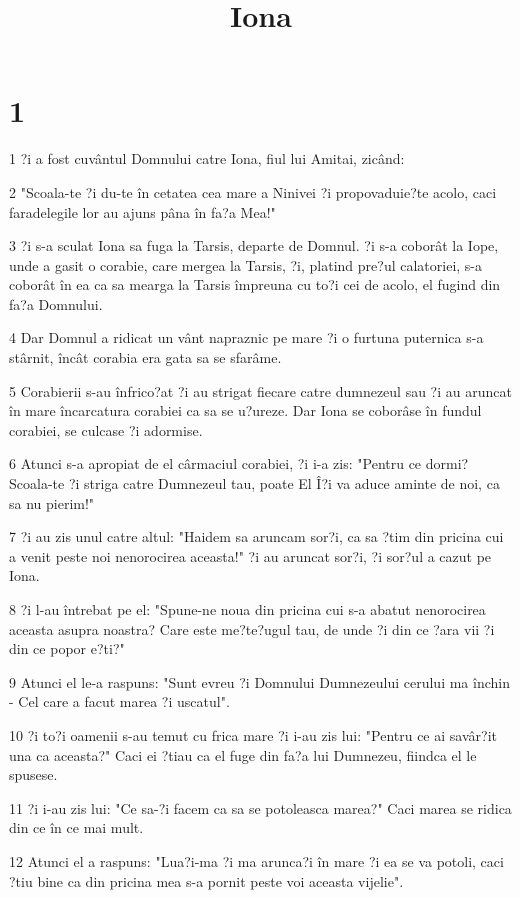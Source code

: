 

\title{Iona}


\chapter{1}

\par 1 ?i a fost cuvântul Domnului catre Iona, fiul lui Amitai, zicând:
\par 2 "Scoala-te ?i du-te în cetatea cea mare a Ninivei ?i propovaduie?te acolo, caci faradelegile lor au ajuns pâna în fa?a Mea!"
\par 3 ?i s-a sculat Iona sa fuga la Tarsis, departe de Domnul. ?i s-a coborât la Iope, unde a gasit o corabie, care mergea la Tarsis, ?i, platind pre?ul calatoriei, s-a coborât în ea ca sa mearga la Tarsis împreuna cu to?i cei de acolo, el fugind din fa?a Domnului.
\par 4 Dar Domnul a ridicat un vânt napraznic pe mare ?i o furtuna puternica s-a stârnit, încât corabia era gata sa se sfarâme.
\par 5 Corabierii s-au înfrico?at ?i au strigat fiecare catre dumnezeul sau ?i au aruncat în mare încarcatura corabiei ca sa se u?ureze. Dar Iona se coborâse în fundul corabiei, se culcase ?i adormise.
\par 6 Atunci s-a apropiat de el cârmaciul corabiei, ?i i-a zis: "Pentru ce dormi? Scoala-te ?i striga catre Dumnezeul tau, poate El Î?i va aduce aminte de noi, ca sa nu pierim!"
\par 7 ?i au zis unul catre altul: "Haidem sa aruncam sor?i, ca sa ?tim din pricina cui a venit peste noi nenorocirea aceasta!" ?i au aruncat sor?i, ?i sor?ul a cazut pe Iona.
\par 8 ?i l-au întrebat pe el: "Spune-ne noua din pricina cui s-a abatut nenorocirea aceasta asupra noastra? Care este me?te?ugul tau, de unde ?i din ce ?ara vii ?i din ce popor e?ti?"
\par 9 Atunci el le-a raspuns: "Sunt evreu ?i Domnului Dumnezeului cerului ma închin - Cel care a facut marea ?i uscatul".
\par 10 ?i to?i oamenii s-au temut cu frica mare ?i i-au zis lui: "Pentru ce ai savâr?it una ca aceasta?" Caci ei ?tiau ca el fuge din fa?a lui Dumnezeu, fiindca el le spusese.
\par 11 ?i i-au zis lui: "Ce sa-?i facem ca sa se potoleasca marea?" Caci marea se ridica din ce în ce mai mult.
\par 12 Atunci el a raspuns: "Lua?i-ma ?i ma arunca?i în mare ?i ea se va potoli, caci ?tiu bine ca din pricina mea s-a pornit peste voi aceasta vijelie".
